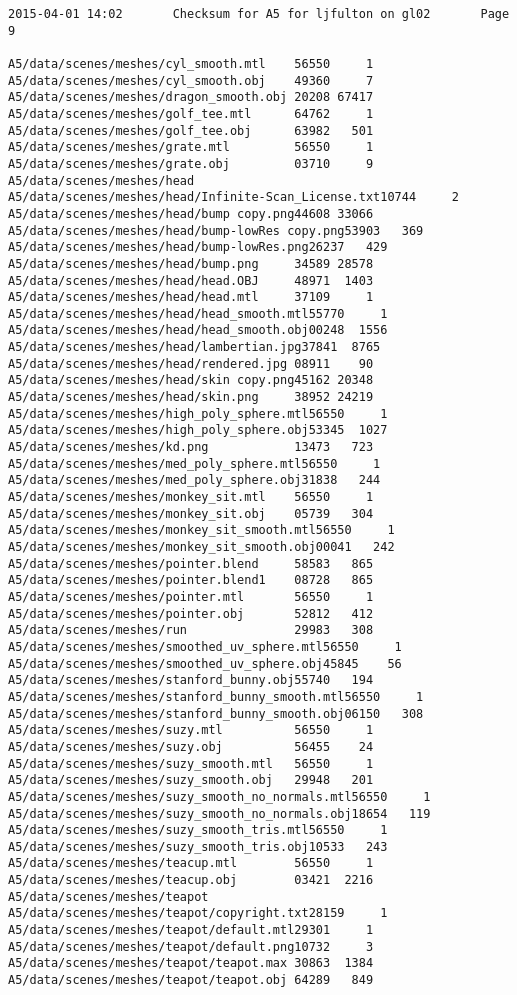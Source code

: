 \documentclass[12pt]{article}
\begin{document}
\begin{verbatim}
2015-04-01 14:02       Checksum for A5 for ljfulton on gl02       Page 9

A5/data/scenes/meshes/cyl_smooth.mtl    56550     1
A5/data/scenes/meshes/cyl_smooth.obj    49360     7
A5/data/scenes/meshes/dragon_smooth.obj 20208 67417
A5/data/scenes/meshes/golf_tee.mtl      64762     1
A5/data/scenes/meshes/golf_tee.obj      63982   501
A5/data/scenes/meshes/grate.mtl         56550     1
A5/data/scenes/meshes/grate.obj         03710     9
A5/data/scenes/meshes/head              
A5/data/scenes/meshes/head/Infinite-Scan_License.txt10744     2
A5/data/scenes/meshes/head/bump copy.png44608 33066
A5/data/scenes/meshes/head/bump-lowRes copy.png53903   369
A5/data/scenes/meshes/head/bump-lowRes.png26237   429
A5/data/scenes/meshes/head/bump.png     34589 28578
A5/data/scenes/meshes/head/head.OBJ     48971  1403
A5/data/scenes/meshes/head/head.mtl     37109     1
A5/data/scenes/meshes/head/head_smooth.mtl55770     1
A5/data/scenes/meshes/head/head_smooth.obj00248  1556
A5/data/scenes/meshes/head/lambertian.jpg37841  8765
A5/data/scenes/meshes/head/rendered.jpg 08911    90
A5/data/scenes/meshes/head/skin copy.png45162 20348
A5/data/scenes/meshes/head/skin.png     38952 24219
A5/data/scenes/meshes/high_poly_sphere.mtl56550     1
A5/data/scenes/meshes/high_poly_sphere.obj53345  1027
A5/data/scenes/meshes/kd.png            13473   723
A5/data/scenes/meshes/med_poly_sphere.mtl56550     1
A5/data/scenes/meshes/med_poly_sphere.obj31838   244
A5/data/scenes/meshes/monkey_sit.mtl    56550     1
A5/data/scenes/meshes/monkey_sit.obj    05739   304
A5/data/scenes/meshes/monkey_sit_smooth.mtl56550     1
A5/data/scenes/meshes/monkey_sit_smooth.obj00041   242
A5/data/scenes/meshes/pointer.blend     58583   865
A5/data/scenes/meshes/pointer.blend1    08728   865
A5/data/scenes/meshes/pointer.mtl       56550     1
A5/data/scenes/meshes/pointer.obj       52812   412
A5/data/scenes/meshes/run               29983   308
A5/data/scenes/meshes/smoothed_uv_sphere.mtl56550     1
A5/data/scenes/meshes/smoothed_uv_sphere.obj45845    56
A5/data/scenes/meshes/stanford_bunny.obj55740   194
A5/data/scenes/meshes/stanford_bunny_smooth.mtl56550     1
A5/data/scenes/meshes/stanford_bunny_smooth.obj06150   308
A5/data/scenes/meshes/suzy.mtl          56550     1
A5/data/scenes/meshes/suzy.obj          56455    24
A5/data/scenes/meshes/suzy_smooth.mtl   56550     1
A5/data/scenes/meshes/suzy_smooth.obj   29948   201
A5/data/scenes/meshes/suzy_smooth_no_normals.mtl56550     1
A5/data/scenes/meshes/suzy_smooth_no_normals.obj18654   119
A5/data/scenes/meshes/suzy_smooth_tris.mtl56550     1
A5/data/scenes/meshes/suzy_smooth_tris.obj10533   243
A5/data/scenes/meshes/teacup.mtl        56550     1
A5/data/scenes/meshes/teacup.obj        03421  2216
A5/data/scenes/meshes/teapot            
A5/data/scenes/meshes/teapot/copyright.txt28159     1
A5/data/scenes/meshes/teapot/default.mtl29301     1
A5/data/scenes/meshes/teapot/default.png10732     3
A5/data/scenes/meshes/teapot/teapot.max 30863  1384
A5/data/scenes/meshes/teapot/teapot.obj 64289   849


\end{verbatim}
\end{document}
